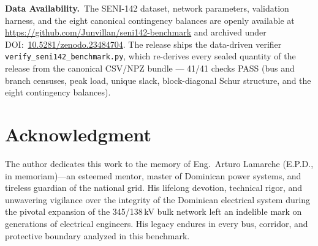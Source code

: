 \documentclass[10pt, journal]{IEEEtran}
\begin{document}
\noindent\textbf{Data Availability.}~The SENI-142 dataset, network parameters, validation harness, and the eight canonical contingency balances are openly available at \url{https://github.com/Junvillan/seni142-benchmark} and archived under DOI:~\href{https://doi.org/10.5281/zenodo.23484704}{10.5281/zenodo.23484704}. The release ships the data-driven verifier \texttt{verify\_seni142\_benchmark.py}, which re-derives every sealed quantity of the release from the canonical CSV/NPZ bundle --- 41/41 checks PASS (bus and branch censuses, peak load, unique slack, block-diagonal Schur structure, and the eight contingency balances).


\section*{Acknowledgment}
The author dedicates this work to the memory of Eng.~Arturo Lamarche (E.P.D., in memoriam)---an esteemed mentor, master of Dominican power systems, and tireless guardian of the national grid. His lifelong devotion, technical rigor, and unwavering vigilance over the integrity of the Dominican electrical system during the pivotal expansion of the 345/138\,kV bulk network left an indelible mark on generations of electrical engineers. His legacy endures in every bus, corridor, and protective boundary analyzed in this benchmark.




\end{document}
